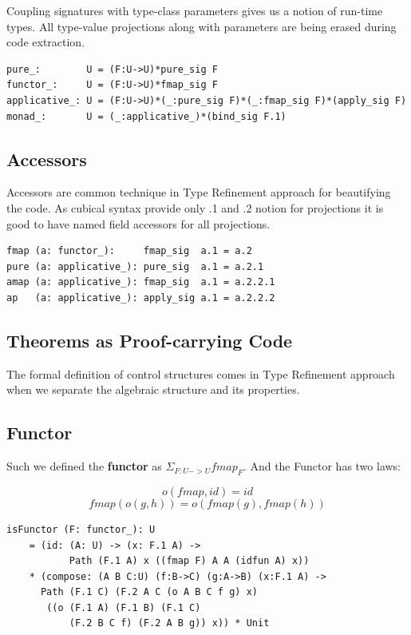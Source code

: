 \documentclass{article}
\begin{document}
Coupling signatures with type-class parameters gives us a notion of run-time types.
All type-value projections along with parameters are being erased during code extraction.

\begin{lstlisting}[mathescape=true]
pure_:        U = (F:U->U)*pure_sig F
functor_:     U = (F:U->U)*fmap_sig F
applicative_: U = (F:U->U)*(_:pure_sig F)*(_:fmap_sig F)*(apply_sig F)
monad_:       U = (_:applicative_)*(bind_sig F.1)
\end{lstlisting}

\subsection{Accessors}

Accessors are common technique in Type Refinement approach for beautifying the code.
As cubical syntax provide only .1 and .2 notion for projections it is good to have
named field accessors for all projections.

\begin{lstlisting}[mathescape=true]
fmap (a: functor_):     fmap_sig  a.1 = a.2
pure (a: applicative_): pure_sig  a.1 = a.2.1
amap (a: applicative_): fmap_sig  a.1 = a.2.2.1
ap   (a: applicative_): apply_sig a.1 = a.2.2.2
\end{lstlisting}

\subsection{Theorems as Proof-carrying Code}

The formal definition of control structures comes in Type Refinement approach when
we separate the algebraic structure and its properties.

\subsection*{Functor}

Such we defined the {\bf functor}
as $\Sigma_{F:U->U} fmap_F$. And the Functor has two laws:

\begin{equation} o(fmap,id) = id \end{equation}
\begin{equation} fmap(o(g,h)) = o(fmap(g),fmap(h)) \end{equation}

\begin{lstlisting}[mathescape=true]
isFunctor (F: functor_): U
    = (id: (A: U) -> (x: F.1 A) ->
           Path (F.1 A) x ((fmap F) A A (idfun A) x))
    * (compose: (A B C:U) (f:B->C) (g:A->B) (x:F.1 A) ->
      Path (F.1 C) (F.2 A C (o A B C f g) x)
       ((o (F.1 A) (F.1 B) (F.1 C)
           (F.2 B C f) (F.2 A B g)) x)) * Unit
\end{lstlisting}
\end{document}
